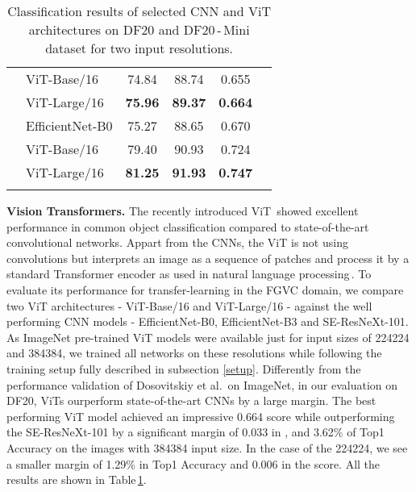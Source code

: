 \documentclass[10pt,twocolumn,letterpaper]{article}
\begin{document}
\begin{table}[t]
\begin{center}
\begin{tabular}{| c | l | c | c | c | c |}
	& ViT-Base/16      & 74.84 & 88.74 & 0.655 & \\
	& ViT-Large/16 & \textbf{75.96} & \textbf{89.37} & \textbf{0.664} & \\
	\cline{1-5}
	\multirow{3}{*}{\rotatebox[origin=c]{90}{DF20}} & EfficientNet-B0  & 75.27 & 88.65 & 0.670 & \\ 
    & ViT-Base/16 & 79.40 & 90.93 & 0.724 & \\
	& ViT-Large/16        & \textbf{81.25} & \textbf{91.93} & \textbf{0.747} & \\ \hline
	\noalign{\vskip 0.5mm}
\end{tabular}
\end{center}
\caption{Classification results of selected CNN and ViT architectures on DF20 and DF20\,-\,Mini dataset for two input resolutions.}
\label{table:results_ViT}
\end{table}


\textbf{Vision Transformers.}
The recently introduced ViT\,\cite{vit} showed excellent performance in common object classification compared to state-of-the-art convolutional networks. Appart from the CNNs, the ViT is not using convolutions but interprets an image as a sequence of patches and process it by a standard Transformer encoder as used in  natural language processing\,\cite{vaswani2017attention}.
To evaluate its performance for transfer-learning in the FGVC domain, we compare two ViT architectures - ViT-Base/16 and ViT-Large/16 - against the well performing CNN models - EfficientNet-B0, EfficientNet-B3 and SE-ResNeXt-101. As ImageNet pre-trained ViT models were available just for input sizes of 224224 and 384384, we trained all networks on these resolutions while following the training setup fully described in subsection \ref{setup}. Differently from the performance validation of Dosovitskiy et al.\,\cite{vit} on ImageNet, in our evaluation on DF20, ViTs ourperform state-of-the-art CNNs by a large margin. The best performing ViT model achieved an impressive 0.664  score while outperforming the SE-ResNeXt-101 by a significant margin of 0.033 in , and 3.62\% of Top1 Accuracy on the images with 384384 input size. In the case of the  224224, we see a smaller margin of 1.29\% in Top1 Accuracy and 0.006 in the   score. All the results are shown in Table\,\ref{table:results_ViT}.
\end{document}
